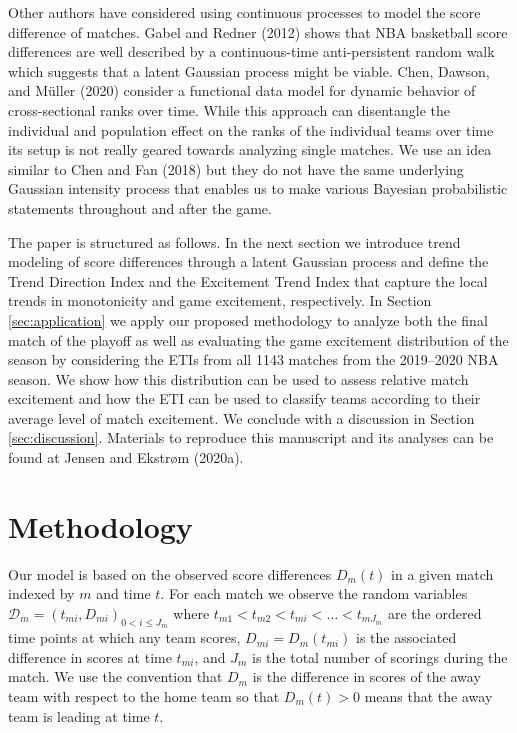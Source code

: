 \documentclass[
  11pt,
]{svjour3}
\theoremstyle{nonumberplain}
\begin{document}
Other authors have considered using continuous processes to model the
score difference of matches. Gabel and Redner (2012) shows that NBA
basketball score differences are well described by a continuous-time
anti-persistent random walk which suggests that a latent Gaussian
process might be viable. Chen, Dawson, and Müller (2020) consider a
functional data model for dynamic behavior of cross-sectional ranks over
time. While this approach can disentangle the individual and population
effect on the ranks of the individual teams over time its setup is not
really geared towards analyzing single matches. We use an idea similar
to Chen and Fan (2018) but they do not have the same underlying Gaussian
intensity process that enables us to make various Bayesian probabilistic
statements throughout and after the game.

The paper is structured as follows. In the next section we introduce
trend modeling of score differences through a latent Gaussian process
and define the Trend Direction Index and the Excitement Trend Index that
capture the local trends in monotonicity and game excitement,
respectively. In Section \ref{sec:application} we apply our proposed
methodology to analyze both the final match of the playoff as well as
evaluating the game excitement distribution of the season by considering
the ETIs from all 1143 matches from the 2019--2020 NBA season. We show
how this distribution can be used to assess relative match excitement
and how the ETI can be used to classify teams according to their average
level of match excitement. We conclude with a discussion in Section
\ref{sec:discussion}. Materials to reproduce this manuscript and its
analyses can be found at Jensen and Ekstrøm (2020a).

\hypertarget{sec:method}{%
\section{Methodology}\label{sec:method}}

Our model is based on the observed score differences \(D_m(t)\) in a
given match indexed by \(m\) and time \(t\). For each match we observe
the random variables
\(\mathcal{D}_m = \left(t_{mi}, D_{mi}\right)_{0 < i \leq J_m}\) where
\(t_{m1} < t_{m2} < t_{mi} < \ldots < t_{m J_m}\) are the ordered time
points at which any team scores, \(D_{mi} = D_m(t_{mi})\) is the
associated difference in scores at time \(t_{mi}\), and \(J_m\) is the
total number of scorings during the match. We use the convention that
\(D_m\) is the difference in scores of the away team with respect to the
home team so that \(D_m(t) > 0\) means that the away team is leading at
time \(t\).
\end{document}

